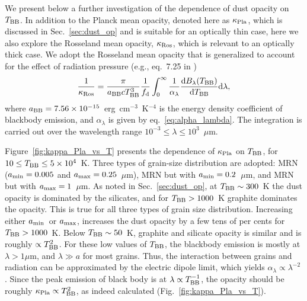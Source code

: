\documentclass[a4paper,fleqn,usenatbib]{mnras}
\newcommand{\dd}{\textrm{d}}
\newcommand{\amin}{\mbox{$a_{\rm min}$}}
\newcommand{\amax}{\mbox{$a_{\rm max}$}}
\newcommand{\mic}{\mbox{$\mu$m}}
\newcommand{\Tbb}{\mbox{$T_{\rm BB}$}}
\begin{document}
We present below a further investigation of the dependence of dust opacity on $T_{\rm BB}$. In addition to the Planck mean opacity, denoted here as $\kappa_{\rm Pla}$, which is discussed in Sec.~\ref{sec:dust_op} and is suitable for an optically thin case, here we also explore the Rosseland mean opacity, $\kappa_{\rm Ros}$, 
which is relevant to an optically thick case. We adopt the Rosseland mean opacity that is generalized to account for the effect of radiation pressure (e.g., eq.~7.25 in \citealt{LamersCassinelli99})
\begin{equation}
\frac{1}{\kappa_{\rm Ros}}=\frac{\pi}{a_{\rm BB} c T_{\rm BB}^3} \frac{1}{f_{\rm d}}\int_0^{\infty} \frac{1}{\alpha_{\lambda}}\frac{\dd B_\lambda(T_{\rm BB})}{\dd T_{\rm BB}} \dd\lambda,
\end{equation}
where $a_{\rm BB}=7.56\times10^{-15}$~erg~cm$^{-3}$~K$^{-4}$ is the energy density coefficient of blackbody 
emission, and $\alpha_{\lambda}$ is given by eq.~\ref{eq:alpha_lambda}. The integration is carried out over the wavelength range $10^{-3}\leq\lambda\leq10^3$~\mic. 

Figure~\ref{fig:kappa_Pla_vs_T} presents the dependence of $\kappa_{\rm Pla}$ on \Tbb, for 
$10\leq\Tbb\leq 5\times 10^4$~K. Three types of grain-size distribution are adopted: MRN ($\amin=0.005$ and $\amax=0.25$~\mic), MRN but with $\amin=0.2$~\mic, and MRN but with $\amax=1$~\mic. As noted in Sec.~\ref{sec:dust_op}, at $\Tbb\sim300$~K the dust opacity is dominated by the silicates, and for $\Tbb>1000$~K graphite dominates the opacity. This is true for all three types of grain size distribution. Increasing either \amin\ or \amax, increases the dust opacity by a few tens of per cents for $\Tbb>1000$~K. Below $\Tbb\sim50$~K, graphite and silicate opacity is similar and is roughly $\propto T_{\rm BB}^2$. For these low values of \Tbb, the blackbody emission is mostly at $\lambda>1$\mic, and $\lambda\gg a$ for most grains. Thus, the interaction between grains and radiation can be approximated by the electric dipole limit, which yields $\alpha_{\lambda}\propto \lambda^{-2}$ \citep{draine11}. Since the peak emission of black body is at $\lambda\propto T_{\rm BB}^{-1}$, the opacity should be roughly $\kappa_{\rm Pla}\propto T_{\rm BB}^2$, as indeed calculated (Fig.~\ref{fig:kappa_Pla_vs_T}).
\end{document}
